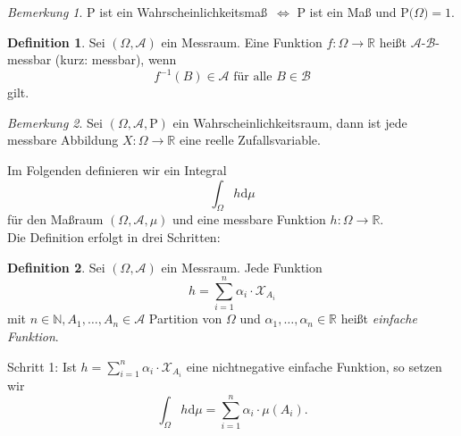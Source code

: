 \documentclass[a4paper,12pt,fleqn]{scrartcl}
\newcommand{\N}{\mathbb{N}}
\newcommand{\R}{\mathbb{R}}
\newcommand{\m}[1]{\mathcal{ #1 }}
\newcommand{\p}[1]{\text{P(} #1 \text{)}}
\newcommand{\WR}{Wahrscheinlichkeitsraum}
\newcommand{\WM}{Wahrscheinlichkeitsmaß}
\theoremstyle{definition}
\newtheorem{definition}{Definition}[section]
\theoremstyle{plain}
\theoremstyle{remark}
\newtheorem*{bemerkung}{Bemerkung}
\begin{document}
\begin{bemerkung}
P ist ein \WM \, $\Leftrightarrow$ P ist ein Maß und $\p{\Omega}=1$.
\end{bemerkung}
\begin{definition}
Sei $(\Omega, \m{A})$ ein Messraum. Eine Funktion $f: \Omega \rightarrow \R$ heißt $\m{A}$-$\m{B}$-messbar (kurz: messbar), wenn
\[f^{-1}(B) \in \m{A} \text{ für alle } B \in \m{B}\]
gilt.
\end{definition}
\begin{bemerkung}
Sei $(\Omega, \m{A}, \text{P})$ ein \WR, dann ist jede messbare Abbildung $X: \Omega \rightarrow \R$ eine reelle Zufallsvariable.
\end{bemerkung}
Im Folgenden definieren wir ein Integral 
\[\int_\Omega h \mathrm{d}\mu\]
für den Maßraum $(\Omega, \m{A}, \mu)$ und eine messbare Funktion $h: \Omega \rightarrow \R$.\\
Die Definition erfolgt in drei Schritten:
\begin{definition}
Sei $(\Omega, \m{A})$ ein Messraum. Jede Funktion
\[h = \sum_{i=1}^n \alpha_i \cdot \m{X}_{A_i}\]
mit $n \in \N, A_1, \ldots, A_n \in \m{A}$ Partition von $\Omega$ und $\alpha_1, \ldots, \alpha_n \in \R$ heißt \emph{einfache Funktion}.\\
\end{definition}
Schritt 1: Ist $h = \sum_{i=1}^n \alpha_i \cdot \m{X}_{A_i}$ eine nichtnegative einfache Funktion, so setzen wir
\[\int_\Omega h \mathrm{d}\mu = \sum_{i=1}^n \alpha_i \cdot \mu(A_i).\]
\end{document}
